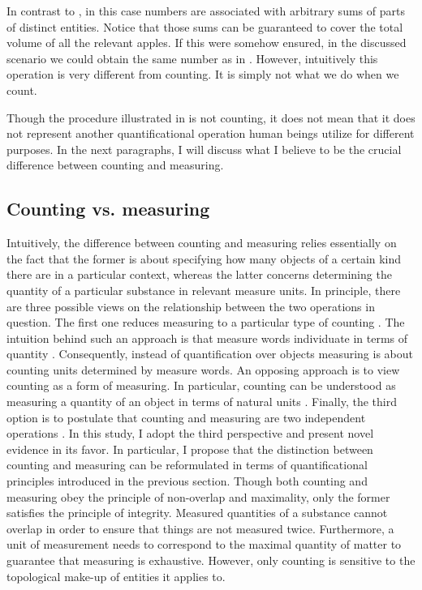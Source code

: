 In contrast to , in this case numbers are associated with arbitrary sums of parts of distinct entities. Notice that those sums can be guaranteed to cover the total volume of all the relevant apples. If this were somehow ensured, in the discussed scenario we could obtain the same number as in . However, intuitively this operation is very different from counting. It is simply not what we do when we count.

Though the procedure illustrated in  is not counting, it does not mean that it does not represent another quantificational operation human beings utilize for different purposes. In the next paragraphs, I will discuss what I believe to be the crucial difference between counting and measuring.

\subsection{Counting vs. measuring}\label{sec:counting-vs-measuring}

Intuitively, the difference between counting and measuring relies essentially on the fact that the former is about specifying how many objects of a certain kind there are in a particular context, whereas the latter concerns determining the quantity of a particular substance in relevant measure units. In principle, there are three possible views on the relationship between the two operations in question. The first one reduces measuring to a particular type of counting \citep[e.g.,][]{gil2013numeral}. The intuition behind such an approach is that measure words individuate in terms of quantity \citep{lyons1977semantics}. Consequently, instead of quantification over objects measuring is about counting units determined by measure words. An opposing approach is to view counting as a form of measuring. In particular, counting can be understood as measuring a quantity of an object in terms of natural units \citep{krifka1989nominal,krifka1995common}. Finally, the third option is to postulate that counting and measuring are two independent operations \citep{rothstein2017semantics}. In this study, I adopt the third perspective and present novel evidence in its favor. In particular, I propose that the distinction between counting and measuring can be reformulated in terms of quantificational principles introduced in the previous section. Though both counting and measuring obey the principle of non-overlap and maximality, only the former satisfies the principle of integrity. Measured quantities of a substance cannot overlap in order to ensure that things are not measured twice. Furthermore, a unit of measurement needs to correspond to the maximal quantity of matter to guarantee that measuring is exhaustive. However, only counting is sensitive to the topological make-up of entities it applies to.

